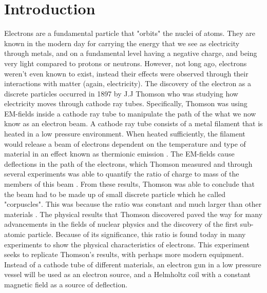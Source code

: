 \documentclass[%
 reprint,
 amsmath,amssymb,
 aps,
]{revtex4-2}
\begin{document}
\maketitle

\section{Introduction}

Electrons are a fundamental particle that "orbits" the nuclei of atoms. They are known in the modern day for carrying the energy that we see as electricity through metals, and on a  fundamental level having a negative charge, and being very light compared to protons or neutrons. However, not long ago, electrons weren't even known to exist, instead their effects were observed through their interactions with matter (again, electricity). The discovery of the electron as a discrete particles occurred in 1897 by J.J Thomson who was studying how electricity moves through cathode ray tubes\cite{Chodos_2000}. Specifically, Thomson was using EM-fields inside a cathode ray tube to manipulate the path of the what we now know as an electron beam. A cathode ray tube consists of a metal filament that is heated in a low pressure environment. When heated sufficiently, the filament would release a beam of electrons dependent on the temperature and type of material in an effect known as thermionic emission \cite{goel2026thermionic}.
The EM-fields cause deflections in the path of the electrons, which Thomson measured and through several experiments was able to quantify the ratio of charge to mass of the members of this beam \cite{Thomson01022010}. From these results, Thomson was able to conclude that the beam had to be made up of small discrete particle which he called "corpuscles". This was because the ratio was constant and much larger than other materials \cite{Thomson01022010}. The physical results that Thomson discovered paved the way for many advancements in the fields of nuclear physics and the discovery of the first sub-atomic particle. Because of its significance, this ratio is found today in many experiments to show the physical characteristics of electrons. This experiment seeks to replicate Thomson's results, with perhaps more modern equipment. Instead of a cathode tube of different materials, an electron gun in a low pressure vessel will be used as an electron source, and a Helmholtz coil with a constant magnetic field as a source of deflection.
\end{document}
